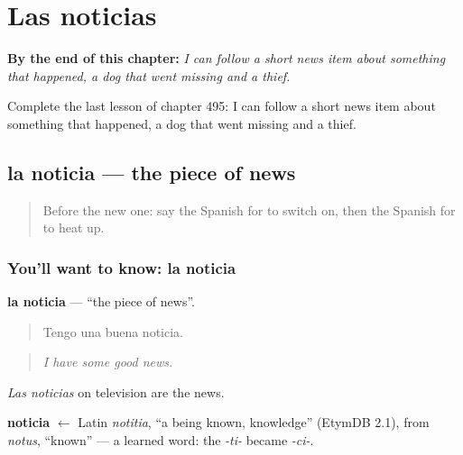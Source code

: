 
\chapter{Las noticias}
\label{ch:es-las-noticias}

\begin{chapteropening}
\textbf{By the end of this chapter:} \emph{I can follow a short news item about something that happened, a dog that went missing and a thief.}

Complete the last lesson of chapter 495: I can follow a short news item about something that happened, a dog that went missing and a thief.
\end{chapteropening}

\section[la noticia]{la noticia — the piece of news}

\label{lesson:ES-C495-noticia}



\begin{quote}
Before the new one: say the Spanish for to switch on, then the Spanish for to heat up.
\end{quote}

\subsection*{You'll want to know: la noticia}
\textbf{la noticia} — \textquotedblleft{}the piece of news\textquotedblright{}.

\begin{quote}
Tengo una buena noticia.
\end{quote}

\begin{quote}
\emph{I have some good news.}
\end{quote}

\emph{Las noticias} on television are the news.

\begin{cousinweb}
\textbf{noticia} $\leftarrow$ Latin \emph{notitia}, \textquotedblleft{}a being known, knowledge\textquotedblright{} (EtymDB 2.1), from \emph{notus}, \textquotedblleft{}known\textquotedblright{} — a learned word: the \emph{-ti-} became \emph{-ci-}.
\end{cousinweb}

